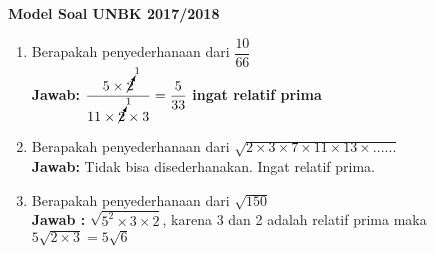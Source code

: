 	\textbf{Model Soal UNBK 2017/2018}
	\begin{enumerate}
		\item Berapakah penyederhanaan dari $\dfrac{10}{66}$\\
		\textbf{Jawab:} $\dfrac{5\times \cancelto{1}{2}}{11\times \cancelto{1}{2} \times 3}=\dfrac{5}{33}$ \textbf{ingat relatif prima}
		\item Berapakah penyederhanaan dari $\sqrt{2\times 3\times 7\times 11\times 13\times ......}$\\
		\textbf{Jawab:} Tidak bisa disederhanakan. Ingat relatif prima.
		\item Berapakah penyederhanaan dari $\sqrt{150}$\\
		\textbf{Jawab :} 
		$\sqrt{5^2\times 3 \times 2}$, karena 3 dan 2 adalah relatif prima maka $5\sqrt{2\times 3}=5\sqrt{6}$
	\end{enumerate}
	
	
	
	
	